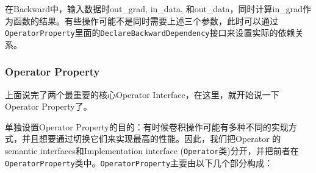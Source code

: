 在Backward中，输入数据时out\_grad, in\_data, 和out\_data，同时计算in\_grad作为函数的结果。有些操作可能不是同时需要上述三个参数，此时可以通过\verb|OperatorProperty|里面的\verb|DeclareBackwardDependency|接口来设置实际的依赖关系。

\subsubsection{Operator Property}

上面说完了两个最重要的核心Operator Interface，在这里，就开始说一下Operator Property了。

单独设置Operator  Property的目的：有时候卷积操作可能有多种不同的实现方式，并且想要通过切换它们来实现最高的性能。因此，我们把Operator 的semantic interfaces和Implementation interface (\verb|Operator|类)分开，并把前者在\verb|OperatorProperty|类中。\verb|OperatorProperty|主要由以下几个部分构成：

